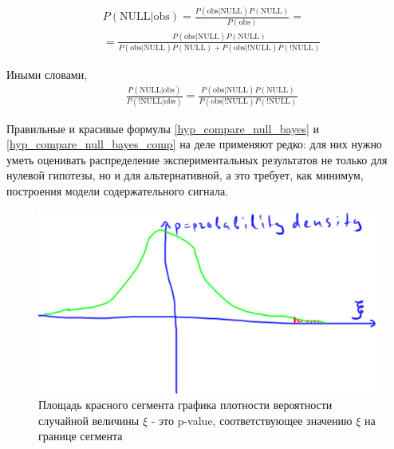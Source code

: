 \documentclass{book}
\begin{document}
\begin{align}\label{hyp_compare_null_bayes}
   &P\left(\text{NULL|obs}\right)=\frac{P\left(\text{obs|NULL}\right) P\left(\text{NULL}\right)}{P\left(\text{obs}\right)} \nonumber =\\
   &=\frac{P\left(\text{obs|NULL}\right) P\left(\text{NULL}\right)}{P\left(\text{obs|NULL}\right) P\left(\text{NULL}\right)+P\left(\text{obs|!NULL}\right) P\left(\text{!NULL}\right)}
\end{align}

Иными словами, 
\begin{align}\label{hyp_compare_null_bayes_comp}
   &\frac{P\left(\text{NULL|obs}\right)}{P\left(\text{!NULL|obs}\right)}=\frac{P\left(\text{obs|NULL}\right) P\left(\text{NULL}\right)}{P\left(\text{obs|!NULL}\right) P\left(\text{!NULL}\right)}
\end{align}

Правильные и красивые формулы \eqref{hyp_compare_null_bayes} и \eqref{hyp_compare_null_bayes_comp} на деле применяют редко: для них нужно уметь оценивать распределение экспериментальных результатов не только для нулевой гипотезы, но и для альтернативной, а это требует, как минимум, построения модели содержательного сигнала. 

\begin{figure}
    \centering
    \includegraphics[scale=.5]{img/p-value.png}
    \caption{Площадь красного сегмента графика плотности вероятности случайной величины $\xi$ - это p-value, соответствующее значению $\xi$ на границе сегмента}
    \label{pval}
\end{figure}



 
\end{document}
